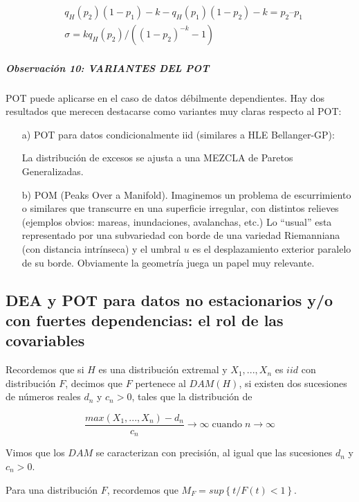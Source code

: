 \documentclass[
  12pt]{article}
\begin{document}
\begin{align}
&q_H(p_2)(1-p_1)-k - q_H(p_1)(1-p_2)-k = p_2 – p_1\\
&\sigma= k q_H(p_2)/( (1-p_2)^{-k} -1)
\end{align}

\subparagraph{Observación 10: VARIANTES DEL
POT}\label{observaciuxf3n-10-variantes-del-pot}

POT puede aplicarse en el caso de datos débilmente dependientes. Hay dos
resultados que merecen destacarse como variantes muy claras respecto al
POT:

\begin{itemize}
\item[a)] POT para datos condicionalmente iid (similares a HLE Bellanger-GP):

La distribución de excesos se ajusta a una MEZCLA de Paretos Generalizadas.
\item[b)] POM (Peaks Over a Manifold).
Imaginemos un problema de escurrimiento o similares que transcurre en una superficie irregular, con distintos relieves (ejemplos obvios: mareas, inundaciones, avalanchas, etc.)
Lo “usual” esta representado por una subvariedad con borde de una variedad Riemanniana (con distancia intrínseca) y el umbral $u$ es el desplazamiento exterior paralelo de su borde. Obviamente la geometría juega un papel muy relevante. 
\end{itemize}

\subsection{DEA y POT para datos no estacionarios y/o con fuertes dependencias: el rol de las covariables}\label{sec:cap4}

Recordemos que si \(H\) es una distribución extremal y \(X_1,...,X_n\)
es \(iid\) con distribución \(F\), decimos que \(F\) pertenece al
\(DAM(H)\), si existen dos sucesiones de números reales \(d_n\) y
\(c_n>0\), tales que la distribución de

\begin{equation}
\frac{max(X_1,...,X_n)- d_n}{c_n}\longrightarrow \infty \;\text{cuando}\;n\longrightarrow \infty
\end{equation}

Vimos que los \(DAM\) se caracterizan con precisión, al igual que las
sucesiones \(d_n\) y \(c_n>0\).

Para una distribución \(F\), recordemos que
\(M_F= sup\left\{ t / F(t)<1  \right\}\).
\end{document}
